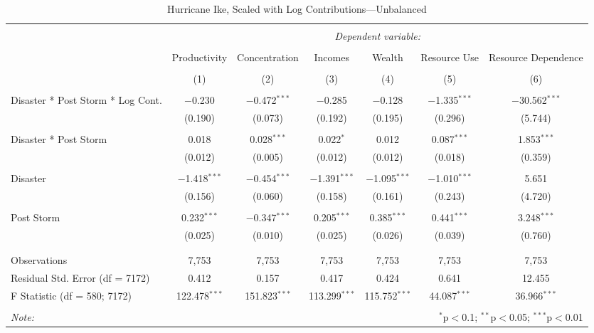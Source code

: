 
\begin{table}[!htbp] \centering 
  \caption{Hurricane Ike, Scaled with Log Contributions---Unbalanced} 
  \label{} 
\footnotesize 
\begin{tabular}{@{\extracolsep{5pt}}lcccccc} 
\\[-1.8ex]\hline 
\hline \\[-1.8ex] 
 & \multicolumn{6}{c}{\textit{Dependent variable:}} \\ 
\cline{2-7} 
\\[-1.8ex] & Productivity & Concentration & Incomes & Wealth & Resource Use & Resource Dependence \\ 
\\[-1.8ex] & (1) & (2) & (3) & (4) & (5) & (6)\\ 
\hline \\[-1.8ex] 
 Disaster * Post Storm * Log Cont. & $-$0.230 & $-$0.472$^{***}$ & $-$0.285 & $-$0.128 & $-$1.335$^{***}$ & $-$30.562$^{***}$ \\ 
  & (0.190) & (0.073) & (0.192) & (0.195) & (0.296) & (5.744) \\ 
  & & & & & & \\ 
 Disaster * Post Storm & 0.018 & 0.028$^{***}$ & 0.022$^{*}$ & 0.012 & 0.087$^{***}$ & 1.853$^{***}$ \\ 
  & (0.012) & (0.005) & (0.012) & (0.012) & (0.018) & (0.359) \\ 
  & & & & & & \\ 
 Disaster & $-$1.418$^{***}$ & $-$0.454$^{***}$ & $-$1.391$^{***}$ & $-$1.095$^{***}$ & $-$1.010$^{***}$ & 5.651 \\ 
  & (0.156) & (0.060) & (0.158) & (0.161) & (0.243) & (4.720) \\ 
  & & & & & & \\ 
 Post Storm & 0.232$^{***}$ & $-$0.347$^{***}$ & 0.205$^{***}$ & 0.385$^{***}$ & 0.441$^{***}$ & 3.248$^{***}$ \\ 
  & (0.025) & (0.010) & (0.025) & (0.026) & (0.039) & (0.760) \\ 
  & & & & & & \\ 
\hline \\[-1.8ex] 
Observations & 7,753 & 7,753 & 7,753 & 7,753 & 7,753 & 7,753 \\ 
Residual Std. Error (df = 7172) & 0.412 & 0.157 & 0.417 & 0.424 & 0.641 & 12.455 \\ 
F Statistic (df = 580; 7172) & 122.478$^{***}$ & 151.823$^{***}$ & 113.299$^{***}$ & 115.752$^{***}$ & 44.087$^{***}$ & 36.966$^{***}$ \\ 
\hline 
\hline \\[-1.8ex] 
\textit{Note:}  & \multicolumn{6}{r}{$^{*}$p$<$0.1; $^{**}$p$<$0.05; $^{***}$p$<$0.01} \\ 
\end{tabular} 
\end{table} 
